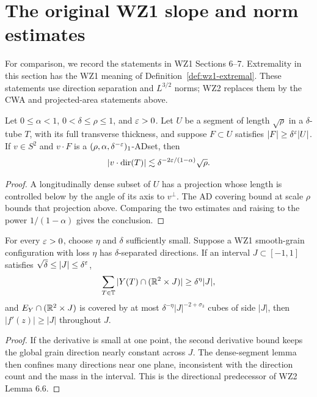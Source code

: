 \section{The original WZ1 slope and norm estimates}

For comparison, we record the statements in WZ1 Sections 6--7.
Extremality in this section has the WZ1 meaning of
Definition~\ref{def:wz1-extremal}. These statements use direction
separation and $L^{3/2}$ norms; WZ2 replaces them by the CWA and
projected-area statements above.

\begin{lemma}
\label{lem:wz1-dense-segment}
Let $0\leq\alpha<1$, $0<\delta\leq\rho\leq1$, and $\varepsilon>0$.
Let $U$ be a segment of length $\sqrt\rho$ in a $\delta$-tube $T$,
with its full transverse thickness, and suppose
$F\subset U$ satisfies $|F|\geq\delta^\varepsilon|U|$. If $v\in S^2$
and $v\cdot F$ is a $(\rho,\alpha,\delta^{-\varepsilon})_1$-ADset, then
\[
                 |v\cdot\operatorname{dir}(T)|
                     \lesssim\delta^{-2\varepsilon/(1-\alpha)}\sqrt\rho.
\]
\end{lemma}
\begin{proof}
A longitudinally dense subset of $U$ has a projection whose length
is controlled below by the angle of its axis to $v^\perp$.
The AD covering bound at scale $\rho$ bounds that projection above.
Comparing the two estimates and raising to the power $1/(1-\alpha)$
gives the conclusion.
\end{proof}

\begin{lemma}
\label{lem:wz1-large-derivative}
For every $\varepsilon>0$, choose $\eta$ and $\delta$ sufficiently small.
Suppose a WZ1 smooth-grain configuration with loss $\eta$ has
$\delta$-separated directions. If an interval $J\subset[-1,1]$
satisfies $\sqrt\delta\leq|J|\leq\delta^\varepsilon$,
\[
 \sum_{T\in\mathbb{T}}|Y(T)\cap(\mathbb{R}^2\times J)|\geq\delta^\eta|J|,
\]
and $E_Y\cap(\mathbb{R}^2\times J)$ is covered by at most
$\delta^{-\eta}|J|^{-2+\sigma_3}$ cubes of side $|J|$, then
$|f'(z)|\geq|J|$ throughout $J$.
\end{lemma}
\begin{proof}
If the derivative is small at one point, the second derivative bound
keeps the global grain direction nearly constant across $J$. The
dense-segment lemma then confines many directions near one plane,
inconsistent with the direction count and the mass in the interval.
This is the directional predecessor of WZ2 Lemma 6.6.
\end{proof}

